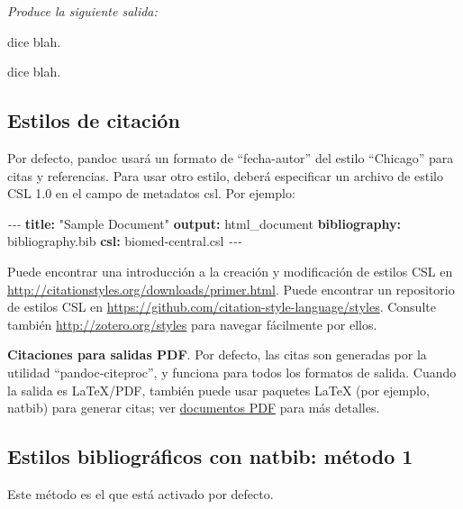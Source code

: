\documentclass[12pt,a4paper,]{book}
\newenvironment{Shaded}{\begin{snugshade}}{\end{snugshade}}
\newcommand{\AttributeTok}[1]{\textcolor[rgb]{0.13,0.29,0.53}{#1}}
\newcommand{\FunctionTok}[1]{\textcolor[rgb]{0.13,0.29,0.53}{\textbf{#1}}}
\newcommand{\KeywordTok}[1]{\textcolor[rgb]{0.13,0.29,0.53}{\textbf{#1}}}
\newcommand{\PreprocessorTok}[1]{\textcolor[rgb]{0.56,0.35,0.01}{\textit{#1}}}
\newcommand{\StringTok}[1]{\textcolor[rgb]{0.31,0.60,0.02}{#1}}
\numberwithin{dummy}{section}
\theoremstyle{ocrenumbox}
\theoremstyle{blacknumex}
\theoremstyle{blacknumbox}
\theoremstyle{ocrenum}
\theoremstyle{ocrenum}
\begin{document}
\emph{Produce la siguiente salida:}

\citet{Luque2017} dice blah.

\citet[pág. 33]{Luque2017} dice blah.

\hypertarget{estilos-de-citaciuxf3n}{%
\subsection{Estilos de citación}\label{estilos-de-citaciuxf3n}}

Por defecto, pandoc usará un formato de ``fecha-autor'' del estilo
``Chicago'' para citas y referencias. Para usar otro estilo, deberá
especificar un archivo de estilo CSL 1.0 en el campo de metadatos csl.
Por ejemplo:

\begin{Shaded}
\begin{Highlighting}[]
\PreprocessorTok{{-}{-}{-}}
\FunctionTok{title}\KeywordTok{:}\AttributeTok{ }\StringTok{"Sample Document"}
\FunctionTok{output}\KeywordTok{:}\AttributeTok{ html\_document}
\FunctionTok{bibliography}\KeywordTok{:}\AttributeTok{ bibliography.bib}
\FunctionTok{csl}\KeywordTok{:}\AttributeTok{ biomed{-}central.csl}
\PreprocessorTok{{-}{-}{-}}
\end{Highlighting}
\end{Shaded}

Puede encontrar una introducción a la creación y modificación de estilos
CSL en \url{http://citationstyles.org/downloads/primer.html}. Puede
encontrar un repositorio de estilos CSL en
\url{https://github.com/citation-style-language/styles}. Consulte
también \url{http://zotero.org/styles} para navegar fácilmente por
ellos.

\textbf{Citaciones para salidas PDF}. Por defecto, las citas son
generadas por la utilidad ``pandoc-citeproc'', y funciona para todos los
formatos de salida. Cuando la salida es LaTeX/PDF, también puede usar
paquetes LaTeX (por ejemplo, natbib) para generar citas; ver
\href{https://bookdown.org/yihui/rmarkdown/pdf-document.html}{documentos
PDF} para más detalles.

\hypertarget{estilos-bibliogruxe1ficos-con-natbib-muxe9todo-1}{%
\subsection{Estilos bibliográficos con natbib: método
1}\label{estilos-bibliogruxe1ficos-con-natbib-muxe9todo-1}}

Este método es el que está activado por defecto.
\end{document}
